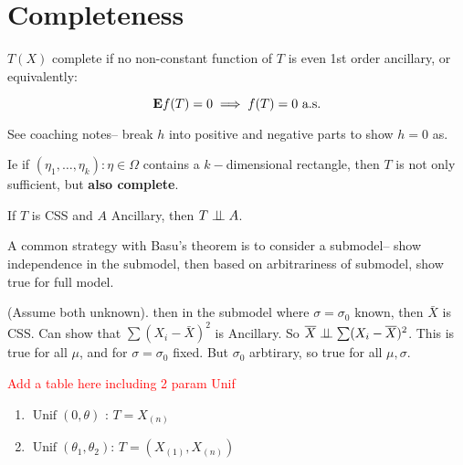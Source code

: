 \documentclass{article}
\newcommand\myworries[1]{\textcolor{red}{#1}}
\newcommand{\Unif}{\operatorname{Unif}}
\begin{document}
\section{Completeness} 
\begin{definition}[Completeness]
$T(X)$ complete if no non-constant function of $T$ is even 1st order ancillary, or equivalently:

$$\mathbf{E} f(T) = 0 \implies f(T) = 0 \text{ a.s}.$$
\end{definition}
\begin{example}[$X_i\sim\Unif(0,\theta)$]
See coaching notes-- break $h$ into positive and negative parts to show $h = 0$ as. 	
\end{example}
\begin{theorem}
Ie if $(\eta_1,\ldots, \eta_k): \eta \in \Omega$ contains a $k-$dimensional rectangle, then $T$ is not only sufficient, but \textbf{also complete}.
\end{theorem}
\begin{theorem}
If $T$ is CSS and $A$ Ancillary, then $T\perp \! \! \! \perp A$. 
\end{theorem}
A common strategy with Basu's theorem is to consider a submodel-- show independence in the submodel, then based on arbitrariness of submodel, show true for full model. 
\begin{example}
(Assume both unknown). then in the submodel where $\sigma = \sigma_0$ known, then $\bar X$ is CSS. Can show that $\sum (X_i - \bar X)^2$ is Ancillary. So $\overline X \perp \! \! \! \perp \sum (X_i - \overline X)^2$. This is true for all $\mu$, and for $\sigma = \sigma_0$ fixed. But $\sigma_0$ arbtirary, so true for all $\mu,\sigma$. 	
\end{example}
\myworries{Add a table here including 2 param Unif}
\begin{enumerate}
	\item $\Unif(0,\theta)$ : $T= X_{(n)}$
	\item $\Unif(\theta_1, \theta_2)$: $T = (X_{(1)}, X_{(n)})$
\end{enumerate}
\end{document}
